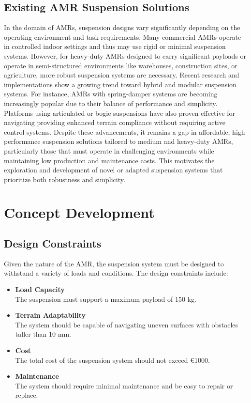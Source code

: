 \documentclass[11pt]{article}
\begin{document}
\subsection{Existing AMR Suspension Solutions}
In the domain of AMRs, suspension designs vary significantly depending on the operating environment and task requirements. Many commercial AMRs operate in controlled indoor settings and thus may use rigid or minimal suspension systems. However, for heavy-duty AMRs designed to carry significant payloads or operate in semi-structured environments like warehouses, construction sites, or agriculture, more robust suspension systems are necessary.
Recent research and implementations show a growing trend toward hybrid and modular suspension systems. For instance, AMRs with spring-damper systems are becoming increasingly popular due to their balance of performance and simplicity. Platforms using articulated or bogie suspensions have also proven effective for navigating providing enhanced terrain compliance without requiring active control systems.
Despite these advancements, it remains a gap in affordable, high-performance suspension solutions tailored to medium and heavy-duty AMRs, particularly those that must operate in challenging environments while maintaining low production and maintenance costs. This motivates the exploration and development of novel or adapted suspension systems that prioritize both robustness and simplicity.

\newpage

\section{Concept Development}

\subsection{Design Constraints}
Given the nature of the AMR, the suspension system must be designed to withstand a variety of loads and conditions. The design constraints include:
\begin{itemize}
    \item \textbf{Load Capacity} \\ The suspension must support a maximum payload of 150 kg.
    \item \textbf{Terrain Adaptability} \\ The system should be capable of navigating uneven surfaces with obstacles taller than 10 mm.
    \item \textbf{Cost} \\ The total cost of the suspension system should not exceed €1000.
    \item \textbf{Maintenance} \\ The system should require minimal maintenance and be easy to repair or replace.
\end{itemize}
\end{document}
